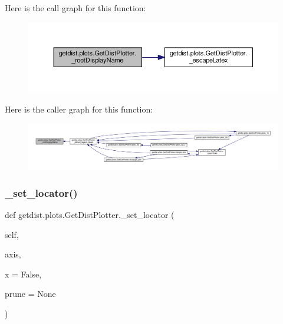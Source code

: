 Here is the call graph for this function\+:
\nopagebreak
\begin{figure}[H]
\begin{center}
\leavevmode
\includegraphics[width=350pt]{classgetdist_1_1plots_1_1GetDistPlotter_ad7bb533b92ff93733da80a76c65ae47e_cgraph}
\end{center}
\end{figure}
Here is the caller graph for this function\+:
\nopagebreak
\begin{figure}[H]
\begin{center}
\leavevmode
\includegraphics[width=350pt]{classgetdist_1_1plots_1_1GetDistPlotter_ad7bb533b92ff93733da80a76c65ae47e_icgraph}
\end{center}
\end{figure}
\mbox{\label{classgetdist_1_1plots_1_1GetDistPlotter_ab90583e444bd0707e6a4a632cd41ce8c}} 
\subsubsection{\texorpdfstring{\+\_\+set\+\_\+locator()}{\_set\_locator()}}
{\footnotesize\ttfamily def getdist.\+plots.\+Get\+Dist\+Plotter.\+\_\+set\+\_\+locator (\begin{DoxyParamCaption}\item[{}]{self,  }\item[{}]{axis,  }\item[{}]{x = {\ttfamily False},  }\item[{}]{prune = {\ttfamily None} }\end{DoxyParamCaption})\hspace{0.3cm}{\ttfamily [private]}}

